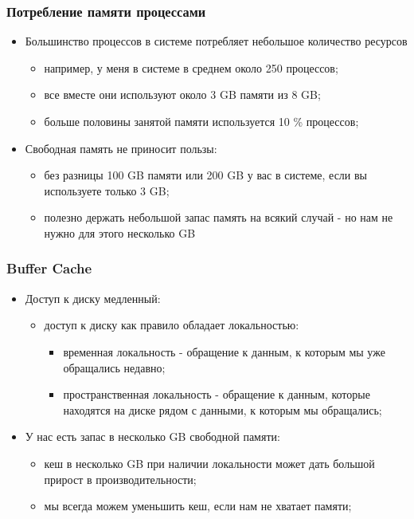 \begin{frame}
\frametitle{Потребление памяти процессами}
\begin{itemize}
  \item<1-> Большинство процессов в системе потребляет небольшое количество
            ресурсов
    \begin{itemize}
      \item например, у меня в системе в среднем около 250 процессов;
      \item все вместе они используют около 3 GB памяти из 8 GB;
      \item больше половины занятой памяти используется 10 \% процессов;
    \end{itemize}
  \item<2-> Свободная память не приносит пользы:
    \begin{itemize}
      \item без разницы 100 GB памяти или 200 GB у вас в системе, если вы
            используете только 3 GB;
      \item полезно держать небольшой запас память на всякий случай - но нам не
            нужно для этого несколько GB
    \end{itemize}
\end{itemize}
\end{frame}

\begin{frame}
\frametitle{Buffer Cache}
\begin{itemize}
  \item<1-> Доступ к диску медленный:
    \begin{itemize}
      \item доступ к диску как правило обладает локальностью:
        \begin{itemize}
          \item временная локальность - обращение к данным, к которым мы уже
                обращались недавно;
          \item пространственная локальность - обращение к данным, которые
                находятся на диске рядом с данными, к которым мы обращались;
        \end{itemize}
    \end{itemize}
  \item<2-> У нас есть запас в несколько GB свободной памяти:
    \begin{itemize}
      \item кеш в несколько GB при наличии локальности может дать большой
            прирост в производительности;
      \item мы всегда можем уменьшить кеш, если нам не хватает памяти;
    \end{itemize}
\end{itemize}
\end{frame}

